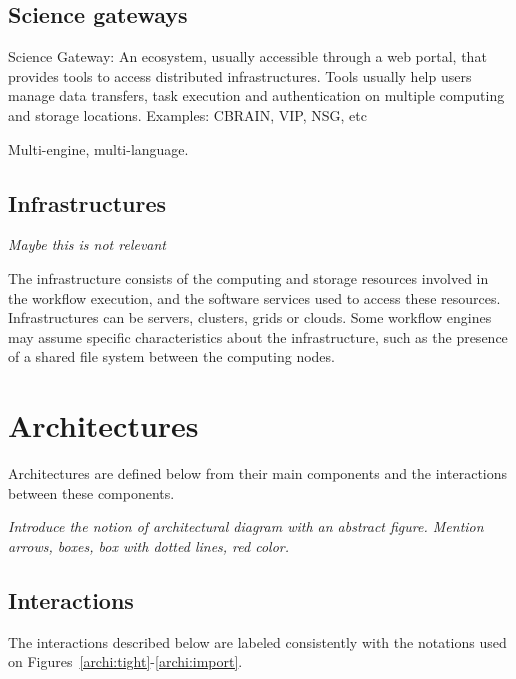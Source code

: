 \documentclass[preprint,3p,twocolumn]{elsarticle}
\newcommand{\todo}[1]{\color{blue}\xspace\emph{#1}\xspace\color{black}}
\begin{document}
\subsection{Science gateways}

Science Gateway: An ecosystem, usually accessible through a web
  portal, that provides tools to access distributed
  infrastructures. Tools usually help users manage data transfers,
  task execution and authentication on multiple computing and storage
  locations. Examples: CBRAIN, VIP, NSG, etc

Multi-engine, multi-language.


\subsection{Infrastructures}

\todo{Maybe this is not relevant}

The infrastructure consists of the computing and storage resources
involved in the workflow execution, and the software services used to
access these resources. Infrastructures can be servers, clusters,
grids or clouds. Some workflow engines may assume specific
characteristics about the infrastructure, such as the presence of a
shared file system between the computing nodes.

\section{Architectures}

Architectures are defined below from their main components and the
interactions between these components.

\todo{Introduce the notion of architectural diagram with an abstract figure. Mention arrows, boxes, box with dotted lines, red color.}


\subsection{Interactions}

The interactions described below are labeled consistently with the
notations used on Figures~\ref{archi:tight}-\ref{archi:import}.
\end{document}
